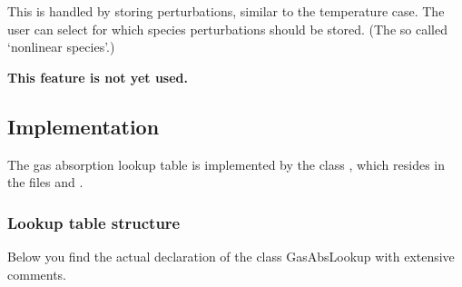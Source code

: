 This is handled by storing perturbations, similar to the temperature
case. The user can select for which species perturbations should be
stored. (The so called `nonlinear species'.)

\textbf{This feature is not yet used.}


\subsection{Implementation}
The gas absorption lookup table is implemented by the class
, which resides in the files
 and .

\subsubsection{Lookup table structure}

Below you find the actual declaration of the class GasAbsLookup with
extensive comments.

